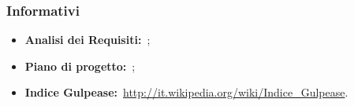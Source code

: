 \documentclass[a4paper]{article}
\newcommand{\importante}[1]{\textbf{#1}} %
\begin{document}
\subsubsection{Informativi}
\begin{itemize}
\item \importante{Analisi dei Requisiti:}\ \ARdoc;
\item \importante{Piano di progetto:}\ \PPdoc;
\item \importante{Indice Gulpease:}\ \url{http://it.wikipedia.org/wiki/Indice_Gulpease}.
\end{itemize}


\end{document}
